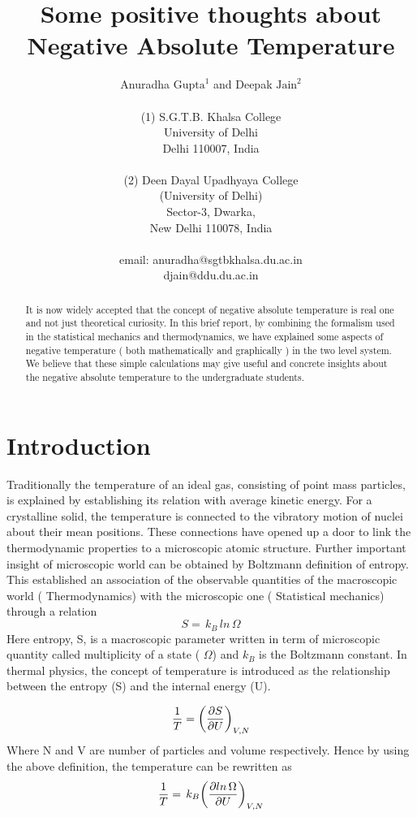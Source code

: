 \documentclass{article}
\title{\bf { Some positive thoughts about Negative Absolute Temperature}}
\author{Anuradha $\text{Gupta}^{1}$ and Deepak $\text{Jain}^2$ \\
\\
(1) S.G.T.B. Khalsa College\\
University of Delhi\\
Delhi 110007, India\\
\\
(2) Deen Dayal Upadhyaya College\\
(University of Delhi)\\
Sector-3, Dwarka,\\
New Delhi 110078, India\\
\\
email: anuradha@sgtbkhalsa.du.ac.in\\
djain@ddu.du.ac.in}
\date{}
\begin{document}
\large
\maketitle
\begin{abstract}
\large  It is now widely accepted that the concept of negative absolute temperature is real one  and not just theoretical curiosity.
In this brief report, by  combining the  formalism used in the statistical mechanics and thermodynamics,  we have explained   some aspects of  negative temperature ( both mathematically and graphically ) in the two level system. We believe that these simple  calculations may give  useful and concrete insights  about the negative absolute temperature to the undergraduate students.
\end{abstract}

\maketitle

\section{Introduction}
Traditionally the temperature of  an ideal gas, consisting of point mass particles,  is explained by establishing its relation with  average kinetic energy. For a crystalline solid, the temperature is connected to the  vibratory motion of nuclei about their mean positions. These connections have opened up a door to link the thermodynamic properties  to a microscopic  atomic structure. Further important insight of microscopic world can be obtained by  Boltzmann definition of entropy.  This established an association  of  the observable quantities of the macroscopic world ( Thermodynamics) with the microscopic one ( Statistical mechanics) through a relation $$ S = \, k_B\, ln  \, \Omega $$
Here entropy, S, is a macroscopic parameter written in term of microscopic quantity called multiplicity of a state ( $ \Omega$) and $k_B$ is the Boltzmann constant. 
 In thermal physics,  the concept of temperature is introduced as the relationship between the entropy (S) and the internal energy (U). 

$$ {1 \over T} = {\left( {\partial S \over \partial U }\right)_{V,N}}
$$
Where N and V are number of particles and volume respectively.
Hence by using the above  definition, the temperature  can be rewritten as 
$$ {1\over T} = \, {  k_B} {\left(  \partial ln \, \Omega \over \partial U \right)_{V,N}}
$$
\end{document}
